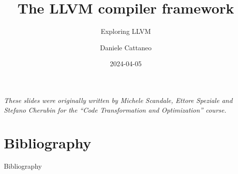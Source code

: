 

\author{Daniele Cattaneo}
\date{2024-04-05} %
\title{The LLVM compiler framework}
\subtitle{Exploring LLVM}
\newcommand{\customdata}{Daniele Cattaneo <daniele.cattaneo@polimi.it>}






\begin{frame}
\maketitle
\begin{center}
\itshape\scriptsize
These slides were originally written by
Michele Scandale, Ettore Speziale and Stefano Cherubin for the
``Code Transformation and Optimization'' course.
\end{center}
\end{frame}








\section{Bibliography}
\begin{frame}[allowframebreaks]{Bibliography}
\nocite{*}


\end{frame}

